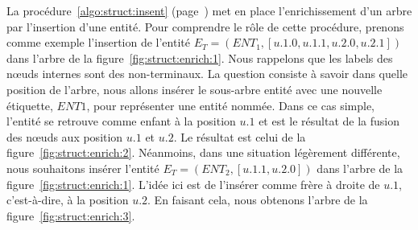 La procédure~\ref{algo:struct:insent} (page~\pageref{algo:struct:insent}) met en place l'enrichissement d'un arbre par l'insertion d'une entité.
Pour comprendre le rôle de cette procédure, prenons comme exemple l'insertion de l'entité $E_{T} = (ENT_1, [u.1.0, u.1.1, u.2.0, u.2.1])$  dans l'arbre de la figure~\ref{fig:struct:enrich:1}.
Nous rappelons que les labels des nœuds internes sont des non-terminaux.
La question consiste à savoir dans quelle position de l'arbre, nous allons insérer le sous-arbre entité avec une nouvelle étiquette, $ENT1$, pour représenter une entité nommée.
Dans ce cas simple, l'entité se retrouve comme enfant à la position $u.1$ et est le résultat de la fusion des nœuds aux position $u.1$ et $u.2$.
Le résultat est celui de la figure~\ref{fig:struct:enrich:2}.
Néanmoins, dans une situation légèrement différente, nous souhaitons insérer l'entité $E_{T} = (ENT_2, [u.1.1, u.2.0])$ dans l'arbre de la figure~\ref{fig:struct:enrich:1}.
L'idée ici est de l'insérer comme frère à droite de $u.1$, c'est-à-dire, à la position $u.2$.
En faisant cela, nous obtenons l'arbre de la figure~\ref{fig:struct:enrich:3}.

